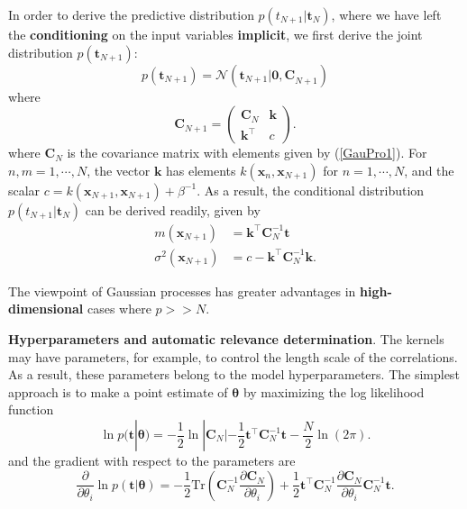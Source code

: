 \documentclass[a4paper]{report}
\newcommand{\up}{\mathrm}
\renewcommand{\bf}{\mathbf}
\renewcommand{\cal}{\mathcal}
\newcommand{\bs}{\boldsymbol}
\begin{document}
In order to derive the predictive distribution $p(t_{N+1}|\bf{t}_N)$, where we have left the \textbf{conditioning} on the input variables \textbf{implicit}, we first derive the joint distribution $p(\bf{t}_{N+1})$:
\begin{equation}
	p(\bf{t}_{N+1}) = \cal{N}(\bf{t}_{N+1}|\bf{0,C}_{N+1})
\end{equation}
where
\begin{equation}
	\bf{C}_{N+1} = \begin{pmatrix}
	 \bf{C}_N & \bf{k} \\
	 \bf{k}^{\intercal} & c
	\end{pmatrix}.
\end{equation}
where $\bf{C}_N$ is the covariance matrix with elements given by (\ref{GauPro1}). For $n,m=1,\cdots,N$, the vector $\bf{k}$ has elements $k(\bf{x}_n,\bf{x}_{N+1})$ for $n=1,\cdots,N$, and the scalar $c=k(\bf{x}_{N+1},\bf{x}_{N+1})+\beta^{-1}$. As a result, the conditional distribution $p(t_{N+1}|\bf{t}_N)$ can be derived readily, given by
\begin{align}
	m(\bf{x}_{N+1}) &= \bf{k}^{\intercal} \bf{C}_N^{-1} \bf{t} \\
	\sigma^2(\bf{x}_{N+1}) &= c - \bf{k}^{\intercal} \bf{C}_N^{-1} \bf{k}.\label{GauPreVar}
\end{align}

The viewpoint of Gaussian processes has greater advantages in \textbf{high-dimensional} cases where $p >> N$.

\textbf{Hyperparameters and automatic relevance determination}. The kernels may have parameters, for example, to control the length scale of the correlations. As a result, these parameters belong to the model hyperparameters. The simplest approach is to make a point estimate of $\bs{\theta}$ by maximizing the log likelihood function
\begin{equation}
 \ln p(\bf{t}|\bs{\theta}) = -\frac{1}{2} \ln |\bf{C}_N| - \frac{1}{2} \bf{t}^{\intercal} \bf{C}_N^{-1} \bf{t} - \frac{N}{2} \ln (2\pi).
\end{equation}
and the gradient with respect to the parameters are
\begin{equation}
	\frac{\partial }{\partial \theta_i} \ln p(\bf{t}|\bs{\theta}) = -\frac{1}{2}\up{Tr}\left( \bf{C}_N^{-1} \frac{\partial \bf{C}_N}{\partial \theta_i} \right) + \frac{1}{2} \bf{t}^{\intercal} \bf{C}_N^{-1} \frac{\partial \bf{C}_N}{\partial \theta_i}\bf{C}_N^{-1} \bf{t}.
\end{equation}
\end{document}
